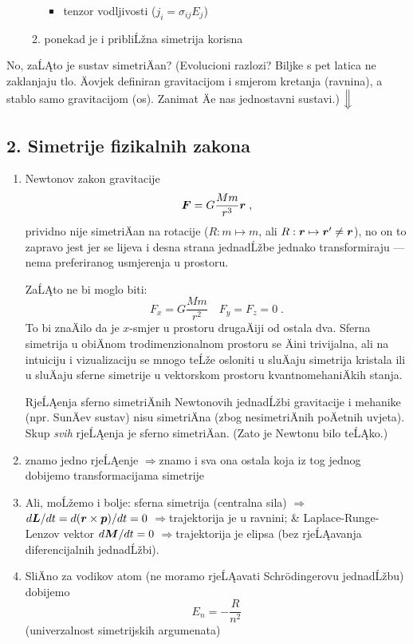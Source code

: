 \documentclass[a4paper,twoside]{article}
\newcommand{\Ra}{$\Rightarrow$}
\def\vec#1{\ensuremath{\mathbf{#1}}}
\def\vec#1{\ensuremath{\mathchoice{\mbox{\boldmath$\displaystyle#1$}}
                              {\mbox{\boldmath$\textstyle#1$}}
                              {\mbox{\boldmath$\scriptstyle#1$}}
                              {\mbox{\boldmath$\scriptscriptstyle#1$}}}}
\begin{document}
\begin{enumerate}[-]
\begin{enumerate}[-]
\begin{itemize}
   \item tenzor vodljivosti ($j_i = \sigma_{ij}E_j$)
   \end{itemize}

\item ponekad je i pribliĹžna simetrija korisna
   
\end{enumerate}

\end{enumerate}

No, zaĹĄto je sustav simetriÄan? (Evolucioni razlozi? Biljke s pet latica
ne zaklanjaju tlo. Äovjek definiran gravitacijom i smjerom kretanja (ravnina),
a stablo samo gravitacijom (os). Zanimat Äe nas jednostavni sustavi.) 
$\Big\Downarrow$

\subsection*{2. Simetrije fizikalnih zakona}

\begin{enumerate}[-]

\item Newtonov zakon gravitacije
\[
      \vec{F}= G \frac{Mm}{r^3}\vec{r} \;,
\]
prividno nije simetriÄan na rotacije ($R:m\mapsto m$, ali $R:\vec{r}
\mapsto \vec{r}'\neq \vec{r}$), no on to zapravo jest jer se lijeva
i desna strana jednadĹžbe jednako transformiraju  --- nema preferiranog
usmjerenja u prostoru.

ZaĹĄto ne bi moglo biti:
\[
      F_x= G \frac{Mm}{r^2} \quad F_y = F_z =0 \;.
\]
To bi znaÄilo da je $x$-smjer u prostoru drugaÄiji od ostala dva.
Sferna simetrija u obiÄnom trodimenzionalnom prostoru se Äini trivijalna,
ali na intuiciju i vizualizaciju se mnogo teĹže osloniti u sluÄaju 
simetrija kristala ili u sluÄaju sferne simetrije u
vektorskom prostoru kvantnomehaniÄkih stanja.

RjeĹĄenja sferno simetriÄnih Newtonovih jednadĹžbi gravitacije i mehanike
(npr. SunÄev sustav) nisu simetriÄna (zbog nesimetriÄnih poÄetnih
uvjeta). Skup \emph{svih} rjeĹĄenja je sferno simetriÄan.
(Zato je Newtonu bilo teĹĄko.)

\item znamo jedno rjeĹĄenje \Ra znamo i sva ona ostala koja iz 
 tog jednog dobijemo transformacijama simetrije

\item Ali, moĹžemo i bolje: sferna simetrija (centralna sila) \Ra
 $d\vec{L}/dt= d(\vec{r}\times\vec{p})/dt=0$ \Ra trajektorija je u ravnini;  
 \& Laplace-Runge-Lenzov vektor $d\vec{M}/dt=0$ \Ra  trajektorija
  je elipsa (bez rjeĹĄavanja diferencijalnih jednadĹžbi).

\item SliÄno za vodikov atom (ne moramo rjeĹĄavati Schr\"{o}dingerovu
  jednadĹžbu) dobijemo
\[
     E_n =-\frac{R}{n^2}
\]
  (univerzalnost simetrijskih argumenata)

\end{enumerate}
\end{document}
